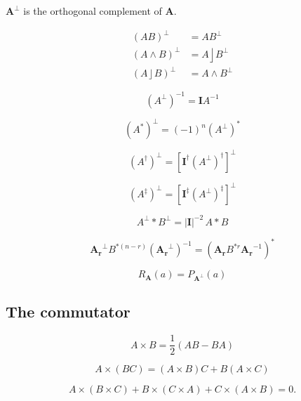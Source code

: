\documentclass{utarticle}
\newcommand{\bl}[1]{\ensuremath{\bm{#1}}}
\newcommand{\I}{\bl{I}}
\DeclareMathOperator{\lin}{\rfloor}
\DeclareMathOperator{\out}{\wedge}
\newcommand{\grinv}[2][]{\ensuremath{#2^{*#1}}}
\newcommand{\rev}[1]{\ensuremath{#1^\dagger}}
\newcommand{\clifconj}[1]{\ensuremath{#1^\ddagger}}
\newcommand{\scprod}[2]{\ensuremath{#1 * #2}}
\newcommand{\commute}[2]{\ensuremath{#1 \times #2}}
\newcommand{\dual}[1]{\ensuremath{#1^\perp}}
\newcommand{\half}{\ensuremath{\frac{1}{2}}}
\begin{document}
\noindent \dual{\bl{A}} is the orthogonal complement of \bl{A}.

\begin{align} 
\dual{(AB)} & = A\dual{B} \\
\dual{(A \out B)} & = A \lin \dual{B} \\
\dual{(A \lin B)} & = A \out \dual{B}
\end{align} 

\begin{equation}
(\dual{A})^{-1} = \I A^{-1}
\end{equation}

\begin{equation}
\dual{(\grinv{A})} = (-1)^n \grinv{(\dual{A})} 
\end{equation}

\begin{equation}
\dual{(\rev{A})} = \dual{\left[\rev{\I} \rev{(\dual{A})}\right]}
\end{equation}

\begin{equation}
\dual{(\clifconj{A})} = \dual{\left[\clifconj{\I} \clifconj{(\dual{A})}\right]}
\end{equation}

\begin{equation}
\scprod{\dual{A}}{\dual{B}} = |\I|^{-2} \, \scprod{A}{B}
\end{equation}

\begin{equation} 
\dual{\bl{A_r}} \grinv[(n-r)]{B} (\dual{\bl{A_r}})^{-1} = \grinv{(\bl{A_r} \grinv[r]{B} \bl{A_r}^{-1})}
\end{equation}

\begin{equation} R_{\bl{A}}(a) = P_{\dual{\bl{A}}}(a) \end{equation} 

\subsection{The commutator}
\label{app:commute}

\begin{equation} \commute{A}{B} = \half(AB - BA) \end{equation}

\begin{equation}
\commute{A}{(BC)} = (\commute{A}{B})C + B(\commute{A}{C})
\end{equation}

\begin{equation}
\commute{A}{(\commute{B}{C})} + \commute{B}{(\commute{C}{A})} + \commute{C}{(\commute{A}{B})} = 0.
\end{equation}
\end{document}
